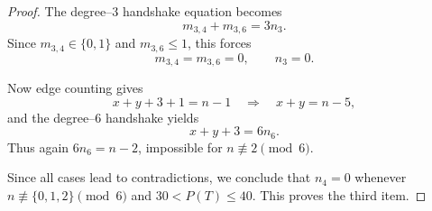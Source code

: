 \documentclass[10pt,a4paper]{amsart}
\begin{document}
\begin{proof}
The degree--$3$ handshake equation becomes
\[
m_{3,4}+m_{3,6}=3n_3 .
\]
Since $m_{3,4}\in\{0,1\}$ and $m_{3,6}\le 1$, this forces
\[
m_{3,4}=m_{3,6}=0, \qquad n_3=0 .
\]

Now edge counting gives
\[
x+y+3+1=n-1 \quad\Rightarrow\quad x+y=n-5 ,
\]
and the degree--$6$ handshake yields
\[
x+y+3=6n_6 .
\]
Thus again $6n_6=n-2$, impossible for $n\not\equiv 2\pmod 6$.

\medskip
Since all cases lead to contradictions, we conclude that $n_4=0$ whenever
$n\not\equiv\{0,1,2\}\pmod 6$ and $30<P(T)\le 40$.  
This proves the third item.
\end{proof}
\end{document}
